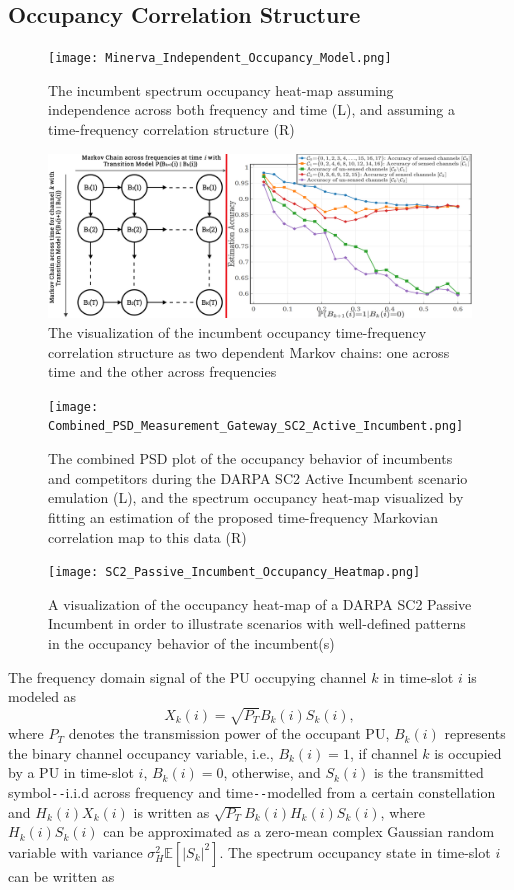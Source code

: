\documentclass[12pt, draftcls, onecolumn]{IEEEtran}
\begin{document}
\subsection{Occupancy Correlation Structure}\label{I.II}
\begin{figure} [htb]
    \centerline{
    \texttt{[image: Minerva\_Independent\_Occupancy\_Model.png]}}
    \caption{The incumbent spectrum occupancy heat-map assuming independence across both frequency and time (L), and assuming a time-frequency correlation structure (R)}
    \label{fig:A.1}
\end{figure}
\begin{figure} [htb]
    \centerline{
    \includegraphics[width = 0.6\linewidth]{MarkovChainsVisualization.png}}
    \caption{The visualization of the incumbent occupancy time-frequency correlation structure as two dependent Markov chains: one across time and the other across frequencies}
    \label{fig:A.3}
\end{figure}
\begin{figure} [htb]
    \centerline{
    \texttt{[image: Combined\_PSD\_Measurement\_Gateway\_SC2\_Active\_Incumbent.png]}}
    \caption{The combined PSD plot of the occupancy behavior of incumbents and competitors during the DARPA SC2 Active Incumbent scenario emulation (L), and the spectrum occupancy heat-map visualized by fitting an estimation of the proposed time-frequency Markovian correlation map to this data (R)}
    \label{fig:A.psd}
\end{figure}
\begin{figure} [htb]
    \centerline{
    \texttt{[image: SC2\_Passive\_Incumbent\_Occupancy\_Heatmap.png]}}
    \caption{A visualization of the occupancy heat-map of a DARPA SC2 Passive Incumbent in order to illustrate scenarios with well-defined patterns in the occupancy behavior of the incumbent(s)}
    \label{fig:A.passive}
\end{figure}
The frequency domain signal of the PU occupying channel $k$ in time-slot $i$ is modeled as
\begin{equation}\label{3}
    X_{k}(i)=\sqrt{P_{T}}B_{k}(i)S_{k}(i),
\end{equation}
where $P_{T}$ denotes the transmission power of the occupant PU, $B_{k}(i)$ represents the binary channel occupancy variable, i.e., $B_{k}(i){=}1$, if channel $k$ is occupied by a PU in time-slot $i$, $B_{k}(i){=}0$, otherwise, and $S_{k}(i)$ is the transmitted symbol\texttt{-{}-}i.i.d across frequency and time\texttt{-{}-}modelled from a certain constellation and $H_{k}(i)X_{k}(i)$ is written as $\sqrt{P_{T}}B_{k}(i)H_{k}(i)S_{k}(i)$, where $H_{k}(i)S_{k}(i)$ can be approximated as a zero-mean complex Gaussian random variable with variance $\sigma_{H}^{2}\mathbb{E}[|S_{k}|^{2}]$. The spectrum occupancy state in time-slot $i$ can be written as
\end{document}
